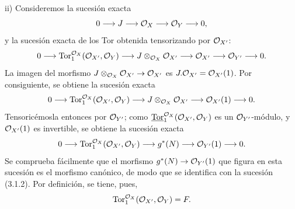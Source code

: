 ii) Consideremos la sucesión exacta
\[
0\longrightarrow J\longrightarrow\mathcal O_X\longrightarrow\mathcal O_Y\longrightarrow0,
\]
y la sucesión exacta de los Tor obtenida tensorizando por \(\mathcal O_{X'}\):
\[
0\longrightarrow
\operatorname{Tor}_1^{\mathcal O_X}(\mathcal O_{X'},\mathcal O_Y)
\longrightarrow
J\otimes_{\mathcal O_X}\mathcal O_{X'}
\longrightarrow
\mathcal O_{X'}
\longrightarrow
\mathcal O_{Y'}
\longrightarrow0.
\]
La imagen del morfismo \(J\otimes_{\mathcal O_X}\mathcal O_{X'}\to\mathcal O_{X'}\) es
\(J.\mathcal O_{X'}=\mathcal O_{X'}(1)\). Por consiguiente, se obtiene la sucesión exacta
\[
0\longrightarrow
\operatorname{Tor}_1^{\mathcal O_X}(\mathcal O_{X'},\mathcal O_Y)
\longrightarrow
J\otimes_{\mathcal O_X}\mathcal O_{X'}
\longrightarrow
\mathcal O_{X'}(1)
\longrightarrow0.
\]
Tensoricémosla entonces por \(\mathcal O_{Y'}\); como
\(\underline{\operatorname{Tor}}_1^{\mathcal O_X}(\mathcal O_{X'},\mathcal O_Y)\) es un \(\mathcal O_{Y'}\)-módulo, y
\(\mathcal O_{X'}(1)\) es invertible, se obtiene la sucesión exacta
\[
0\longrightarrow
\operatorname{Tor}_1^{\mathcal O_X}(\mathcal O_{X'},\mathcal O_Y)
\longrightarrow
g^*(N)
\longrightarrow
\mathcal O_{Y'}(1)
\longrightarrow0.
\]
Se comprueba fácilmente que el morfismo \(g^*(N)\to\mathcal O_{Y'}(1)\) que figura en esta sucesión es el morfismo canónico, de modo que se identifica con la sucesión (3.1.2). Por definición, se tiene, pues,
\[
\operatorname{Tor}_1^{\mathcal O_X}(\mathcal O_{X'},\mathcal O_Y)=F.
\]
